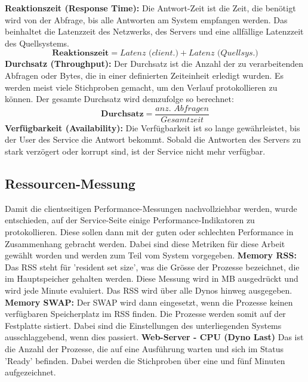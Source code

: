 \documentclass[main.tex]{subfiles}
\begin{document}
\noindent
\textbf{Reaktionszeit (Response Time):} Die Antwort-Zeit ist die Zeit, die benötigt wird von der Abfrage, bis alle Antworten am System empfangen werden. Das beinhaltet die Latenzzeit des Netzwerks, des Servers und eine allfällige Latenzzeit des Quellsystems.
\begin{equation}
\textbf{Reaktionszeit} = \textit{Latenz (client.)}+\textit{Latenz (Quellsys.)}
\end{equation}
\noindent
\textbf{Durchsatz (Throughput):} Der Durchsatz ist die Anzahl der zu verarbeitenden Abfragen oder Bytes, die in einer definierten Zeiteinheit erledigt wurden. Es werden meist viele Stichproben gemacht, um den Verlauf protokollieren zu können\cite[Kap.~4]{Halili:2008:AJ:1481606}. Der gesamte Durchsatz wird demzufolge so berechnet:
\begin{equation}
\textbf{Durchsatz} = \frac{\textit{anz. Abfragen}}{\textit{Gesamtzeit}}
\end{equation}
\noindent
\textbf{Verfügbarkeit (Availability):} Die Verfügbarkeit ist so lange gewährleistet, bis der User des Service die Antwort bekommt. Sobald die Antworten des Servers zu stark verzögert oder korrupt sind, ist der Service nicht mehr verfügbar. 






\subsection{Ressourcen-Messung}
Damit die clientseitigen Performance-Messungen nachvollziehbar werden, wurde entschieden, auf der Service-Seite einige Performance-Indikatoren zu protokollieren. Diese sollen dann mit der guten oder schlechten Performance in Zusammenhang gebracht werden. Dabei sind diese Metriken für diese Arbeit gewählt worden und werden zum Teil vom System vorgegeben.
\newline
\noindent
\textbf{Memory RSS:} Das RSS steht für 'resident set size', was die Grösse der Prozesse bezeichnet, die im Hauptspeicher gehalten werden. Diese Messung wird in MB ausgedrückt und wird jede Minute evaluiert. Das RSS wird über alle Dynos hinweg ausgegeben.
\newline
\noindent
\textbf{Memory SWAP:} Der SWAP wird dann eingesetzt, wenn die Prozesse keinen verfügbaren Speicherplatz im RSS finden. Die Prozesse werden somit auf der Festplatte sistiert. Dabei sind die Einstellungen des unterliegenden Systems ausschlaggebend, wenn dies passiert.
\newline
\noindent
\textbf{Web-Server - CPU (Dyno Last) } Das ist die Anzahl der Prozesse, die auf eine Ausführung warten und sich im Status ’Ready’ befinden. Dabei werden die Stichproben über eine und fünf Minuten aufgezeichnet.
\end{document}
